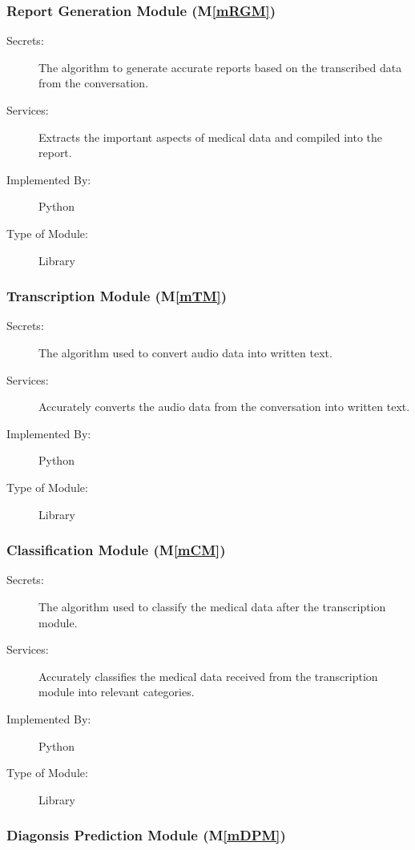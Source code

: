 \documentclass[12pt, titlepage]{article}
\newcommand{\mref}[1]{M\ref{#1}}
\begin{document}
\subsubsection{Report Generation Module (\mref{mRGM})}

\begin{description}
\item[Secrets:] The algorithm to generate accurate reports based on the transcribed data from the conversation.
\item[Services:] Extracts the important aspects of medical data and compiled into the report.
\item[Implemented By:] Python
\item[Type of Module:] Library
\end{description}

\subsubsection{Transcription Module (\mref{mTM})}

\begin{description}
\item[Secrets:] The algorithm used to convert audio data into written text.
\item[Services:] Accurately converts the audio data from the conversation into written text.   
\item[Implemented By:] Python
\item[Type of Module:] Library
\end{description}

\subsubsection{Classification Module (\mref{mCM})}

\begin{description}
\item[Secrets:] The algorithm used to classify the medical data after the transcription module.
\item[Services:] Accurately classifies the medical data received from the transcription module into relevant categories.
\item[Implemented By:] Python
\item[Type of Module:] Library
\end{description}

\subsubsection{Diagonsis Prediction Module (\mref{mDPM})}
\end{document}
